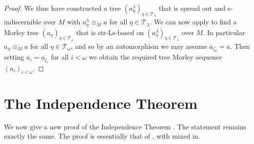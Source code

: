 \documentclass[a4paper, reqno]{amsart}
\theoremstyle{definition}
\theoremstyle{repeat}
\newcommand{\T}{\mathcal{T}}
\begin{document}
\begin{proof}
We thus have constructed a tree $(a^\lambda_\eta)_{\eta \in \T_\lambda}$ that is spread out and s-indiscernible over $M$ with $a^\lambda_\eta \equiv_M a$ for all $\eta \in \T_\lambda$. We can now apply  to find a Morley tree $(a_\eta)_{\eta \in \T_\omega}$ that is str-Ls-based on $(a^\lambda_\eta)_{\eta \in \T_\lambda}$ over $M$. In particular $a_\eta \equiv_M a$ for all $\eta \in \T_\omega$, and so by an automorphism we may assume $a_{\zeta_0} = a$. Then setting $a_i = a_{\zeta_i}$ for all $i < \omega$ we obtain the required tree Morley sequence $(a_i)_{i < \omega}$.
\end{proof}

\section{The Independence Theorem}
\label{sec:independence-theorem}
We now give a new proof of the Independence Theorem \cite[Theorem 7.7]{dobrowolski_kim-independence_2022}. The statement remains exactly the same. The proof is essentially that of \cite[Theorem 6.5]{kaplan_kim-independence_2020}, with  mixed in.
\end{document}
